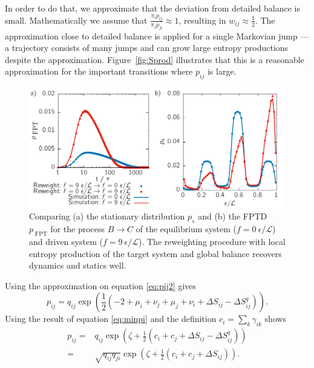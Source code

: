 In order to do that, we approximate that the deviation from detailed balance is small. Mathematically we assume that $\frac{\pi_i p_{ij}}{\pi_j p_{ji}} \approx 1 $, resulting in $w_{ij} \approx \frac{1}{2}$.  The approximation close to detailed balance is applied for a single Markovian jump --- a trajectory consists of many jumps and can grow large entropy productions despite the approximation. 
Figure~\ref{fig:Sprod} illustrates that this is a reasonable approximation for the important transitions where $p_{ij}$ is large.  
\begin{figure}[t]
 \centering
 \includegraphics{../plots/Jaynes/fpt_2010_2910.pdf}
 \caption[Stationary distribution and first-passage time distribution for the driven 1D system reweighted with respect to local entropy production and global balance.]{Comparing (a) the stationary distribution $p_s$ and (b) the FPTD $p_{\; \text{FPT}}$ for the process $B \rightarrow C$ of the equilibrium system ($f=0~\epsilon / \mathcal{L}$) and driven system ($f=9~\epsilon / \mathcal{L}$). The reweighting procedure with local entropy production of the target system and global balance  recovers dynamics and statics well.}
 \label{fig:rewtrial3}
\end{figure}
Using the approximation on equation \ref{eq:pij2} gives
    \begin{equation}
      p_{ij} = q_{ij} \exp \left ( \frac{1}{2} \left ( -2 + \mu_i +\nu_j +\mu_j 
+ \nu_i + \Delta S_{ij} - \Delta S_{ij}^q \right ) \right ).
    \end{equation}
    Using the result of equation \ref{eq:minpi} and the definition $c_i = \sum_k \gamma_{ik}$ shows
    \begin{equation}
    \begin{aligned}
    p_{ij} =& q_{ij} \exp \left ( \zeta+ \frac{1}{2} \left ( c_i + c_j + \Delta
S_{ij} - \Delta S_{ij}^q \right ) \right ) \\
=&     \sqrt{q_{ij} q_{ji} } \exp \left ( \zeta+ \frac{1}{2} \left ( c_i + c_j + \Delta
S_{ij} \right ) \right ). 
    \end{aligned}
    \label{eq:finalpij}
    \end{equation}
